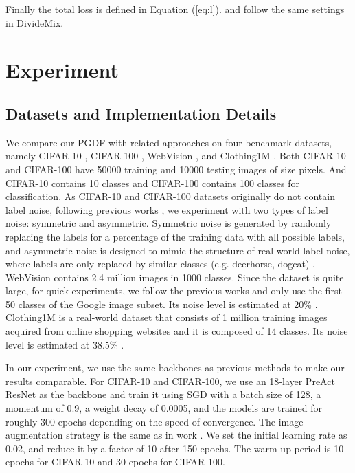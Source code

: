 \documentclass[letterpaper]{article} \usepackage{aaai22}  \usepackage{times}  \usepackage{helvet}  \usepackage{courier}  \usepackage[hyphens]{url}  \usepackage{graphicx} \urlstyle{rm} \def\UrlFont{\rm}  \usepackage{natbib}  \usepackage{caption} \DeclareCaptionStyle{ruled}{labelfont=normalfont,labelsep=colon,strut=off} \frenchspacing  \setlength{\pdfpagewidth}{8.5in}  \setlength{\pdfpageheight}{11in}  \usepackage{algorithm}
\begin{document}
Finally the total loss is defined in Equation (\ref{eq:l}).  and  follow the same settings in DivideMix. 







\section{Experiment}
\subsection{Datasets and Implementation Details}
\label{implementation}

We compare our PGDF with related approaches on four benchmark datasets, namely CIFAR-10 \cite{2009Learning}, CIFAR-100 \cite{2009Learning}, WebVision \cite{2017WebVision}, and Clothing1M \cite{2015Learning}. Both CIFAR-10 and CIFAR-100 have 50000 training and 10000 testing images of size  pixels. And CIFAR-10 contains 10 classes and CIFAR-100 contains 100 classes for classification. As CIFAR-10 and CIFAR-100 datasets originally do not contain label noise, following previous works \cite{2020DivideMix,2021Augmentation}, we experiment with two types of label noise: symmetric and asymmetric. Symmetric noise is generated by randomly replacing the labels for a percentage of the training data with all possible labels, and asymmetric noise is designed to mimic the structure of real-world label noise, where labels are only replaced by similar classes (e.g. deerhorse, dogcat) \cite{2020DivideMix}. {WebVision contains 2.4 million images in 1000 classes. Since the dataset is quite large, for quick experiments, we follow the previous works \cite{chen2019understanding,2020DivideMix,wu2021ngc} and only use the first 50 classes of the Google image subset. Its noise level is estimated at 20\% \cite{2019Prestopping}.} Clothing1M is a real-world dataset that consists of 1 million training images acquired from online shopping websites and it is composed of 14 classes. Its noise level is estimated at 38.5\% \cite{2019Prestopping}.

In our experiment, we use the same backbones as previous methods to make our results comparable. For CIFAR-10 and CIFAR-100, we use an 18-layer PreAct ResNet \cite{2016Identity} as the backbone and train it using SGD with a batch size of 128, a momentum of 0.9, a weight decay of 0.0005, and the models are trained for roughly 300 epochs depending on the speed of convergence. The image augmentation strategy is the same as in work \cite{2021Augmentation}. We set the initial learning rate as 0.02, and reduce it by a factor of 10 after 150 epochs. The warm up period is 10 epochs for CIFAR-10 and 30 epochs for CIFAR-100. 
\end{document}
